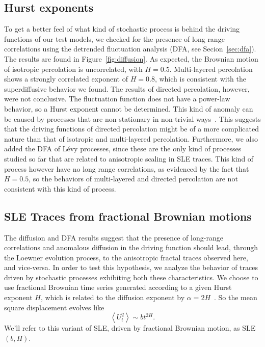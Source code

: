 \subsection{Hurst exponents}
\label{sec:hurst}

To get a better feel of what kind of stochastic process is behind the driving
functions of our test models, we checked for the presence of long range
correlations using the detrended fluctuation analysis (DFA, see
Secion~\ref{sec:dfa}). The results are found in Figure~\ref{fig:diffusion}. As
expected, the Brownian motion of isotropic percolation is uncorrelated, with
$H=0.5$. Multi-layered percolation shows a strongly correlated exponent of
$H=0.8$, which is consistent with the superdiffusive behavior we found. The
results of directed percolation, however, were not conclusive. The fluctuation
function does not have a power-law behavior, so a Hurst exponent cannot be
determined. This kind of anomaly can be caused by processes that are
non-stationary in non-trivial ways~\cite{Hu2001, Chen2002}. This suggests that
the driving functions of directed percolation might be of a more complicated
nature than that of isotropic and multi-layered percolation. Furthermore, we
also added the DFA of Lévy processes, since these are the only kind of
processes studied so far that are related to anisotropic scaling in SLE traces.
This kind of process however have no long range correlations, as evidenced by
the fact that $H=0.5$, so the behaviors of multi-layered and directed
percolation are not consistent with this kind of process.

\subsection{SLE Traces from fractional Brownian motions}
\label{sec:slebh}

The diffusion and DFA results suggest that the presence of long-range
correlations and anomalous diffusion in the driving function should lead,
through the Loewner evolution process, to the anisotropic fractal traces
observed here, and vice-versa. In order to test this hypothesis, we analyze the
behavior of traces driven by stochastic processes exhibiting both these
characteristics. We choose to use fractional Brownian time series generated
according to a given Hurst exponent $H$, which is related to the diffusion
exponent by $\alpha=2H$~\cite{Mandelbrot1968}. So the mean square displacement
evolves like
\begin{equation}
    \left\langle U_{t}^{2}\right\rangle \sim bt^{2H}.
\end{equation}
We'll refer to this variant of SLE, driven by fractional Brownian motion, as
SLE$(b,H)$.

